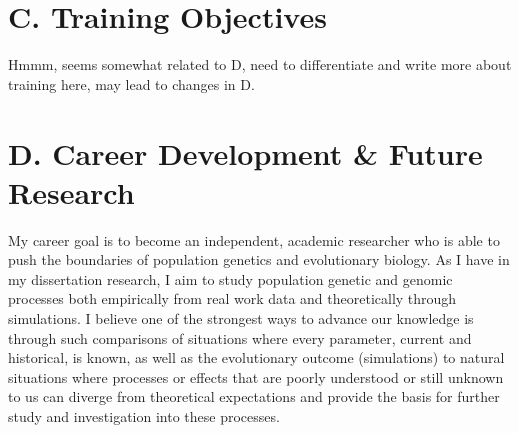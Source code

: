 	
	
	
	
	
	
	
	
	
	
	
	
	
	
	
\section*{C. Training Objectives}

Hmmm, seems somewhat related to D, need to differentiate and write more about training here, may lead to changes in D.

\section*{D. Career Development \& Future Research}

My career goal is to become an independent, academic researcher who is able to push the boundaries of population genetics and evolutionary biology. As I have in my dissertation research, I aim to study population genetic and genomic processes both empirically from real work data and theoretically through simulations. I believe one of the strongest ways to advance our knowledge is through such comparisons of situations where every parameter, current and historical, is known, as well as the evolutionary outcome (simulations) to natural situations where processes or effects that are poorly understood or still unknown to us can diverge from theoretical expectations and provide the basis for further study and investigation into these processes.

